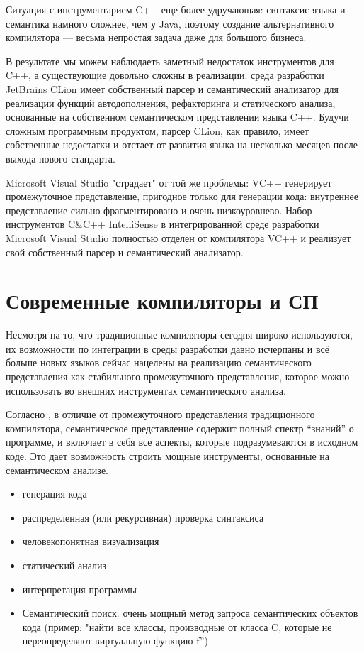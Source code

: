 Ситуация с инструментарием C++ еще более удручающая: синтаксис языка
и семантика намного сложнее, чем у Java, поэтому создание альтернативного
компилятора --- весьма непростая задача даже для большого бизнеса.

В результате мы можем наблюдаеть заметный недостаток инструментов для C++\cite{Zouev2010}, а существующие
довольно сложны в реализации: среда разработки JetBrains CLion имеет собственный парсер
и семантический анализатор для реализации функций автодополнения, рефакторинга и статического анализа,
основанные на собственном семантическом представлении языка C++. 
Будучи сложным программным продуктом, парсер CLion, как правило, имеет собственные недостатки и 
отстает от развития языка на несколько месяцев после выхода нового стандарта.


Microsoft Visual Studio "страдает" от той же проблемы: VC++ генерирует промежуточное представление, пригодное
только для генерации кода: внутреннее представление сильно фрагментировано и очень низкоуровнево.
Набор инструментов C\&C++ IntelliSense в интегрированной среде разработки Microsoft Visual Studio 
полностью отделен от компилятора VC++ и реализует свой собственный парсер и семантический анализатор.

\section{Современные компиляторы и СП}
\label{sec:review_2}

Несмотря на то, что традиционные компиляторы сегодня широко используются, их
возможности по интеграции в среды разработки давно исчерпаны и всё больше новых языков сейчас
нацелены на реализацию семантического представления как стабильного промежуточного представления,
которое можно использовать во внешних инструментах семантического анализа.

Согласно \cite{Zouev2005, Zouev2010}, в отличие от промежуточного представления традиционного компилятора, 
семантическое представление содержит полный спектр ``знаний'' о программе, и включает в себя все аспекты, которые подразумеваются 
в исходном коде. Это дает возможность строить мощные инструменты, основанные на семантическом анализе.

\begin{itemize}
\item генерация кода
\item распределенная (или рекурсивная) проверка синтаксиса
\item человекопонятная визуализация
\item статический анализ
\item интерпретация программы
\item Семантический поиск: очень мощный метод запроса семантических объектов кода (пример: "найти все классы, производные от класса C, которые не переопределяют виртуальную функцию f”)
\end{itemize}

